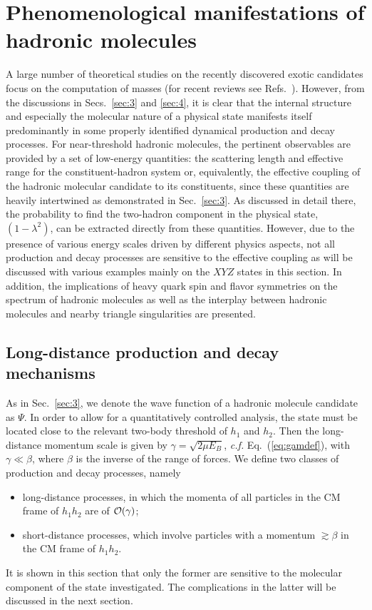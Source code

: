 
\section{Phenomenological manifestations of hadronic molecules}
\label{sec:6}


A large number of  theoretical studies on the recently discovered exotic
candidates focus on the computation of masses (for recent reviews see
Refs.~\cite{Brambilla:2014jmp,Chen:2016qju,Lebed:2016hpi,Esposito:2016noz}).
However, from the discussions in Secs.~\ref{sec:3} and \ref{sec:4}, it is
clear that the internal structure and especially the molecular nature of a
physical state manifests itself predominantly in some properly identified
dynamical production and decay processes. For near-threshold hadronic molecules,
the pertinent observables are provided by a set of low-energy quantities: the
scattering length and effective range for the constituent-hadron system or,
equivalently, the effective coupling of the hadronic molecular candidate to its
constituents, since these quantities are heavily intertwined as demonstrated in
Sec.~\ref{sec:3}. As discussed in detail there, the probability to find the
two-hadron component in the physical state, $(1-\lambda^2)$, can be extracted
directly from these quantities.
However, due to the presence of various energy scales driven by different
physics aspects, not all production and decay processes are sensitive to the
effective coupling as will be discussed with various examples mainly on the
$XYZ$ states in this section.
In addition, the implications of heavy quark spin and flavor symmetries on the
spectrum of hadronic molecules as well as the interplay between hadronic
molecules and nearby triangle singularities are presented.


\subsection{Long-distance production and decay mechanisms}
\label{sec:6-long}

As in Sec.~\ref{sec:3}, we denote the wave function of a hadronic molecule
candidate as $\Psi$. In order to allow for a quantitatively controlled analysis,
the state  must be located close to the relevant two-body threshold of $h_1$ and
$h_2$.
Then the long-distance momentum scale is given by $\gamma=\sqrt{2\mu E_B}$, {\sl
c.f.} Eq.~(\ref{eq:gamdef}), with $\gamma\ll\beta$, where $\beta$ is the inverse
of the range of forces. We define two classes of production and decay processes,
namely
\begin{itemize}
  \item long-distance processes, in which the momenta of all particles in the
CM frame of $h_1h_2$ are of $\mathcal{O}\!\left(\gamma\right)\!\,$;
  \item short-distance processes, which involve particles with a momentum
$\gtrsim \beta$ in the CM frame of $h_1h_2$.
\end{itemize}
It is shown in this section that only the former are sensitive to the molecular
component of the state investigated. The complications in the latter will be
discussed in the next section.

